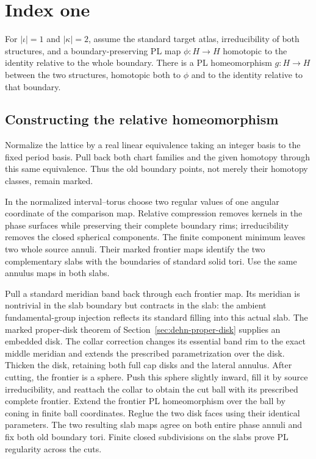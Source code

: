 \section{Index one}
\label{sec:relative-rigidity-index-one}
\label{sec:index-one}

\begin{theorem}
\label{thm:rigidity-index-one}
For $|\iota|=1$ and $|\kappa|=2$, assume the standard target atlas,
irreducibility of both structures, and a boundary-preserving PL map
$\phi:H\to H$ homotopic to the identity relative to the whole boundary.
There is a PL homeomorphism $g:H\to H$ between the two structures,
homotopic both to $\phi$ and to the identity relative to that boundary.
\end{theorem}

\subsection{Constructing the relative homeomorphism}

Normalize the lattice by a real linear equivalence taking an integer
basis to the fixed period basis. Pull back both chart families and the
given homotopy through this same equivalence. Thus the old boundary
points, not merely their homotopy classes, remain marked.

In the normalized interval--torus choose two regular values of one
angular coordinate of the comparison map. Relative compression removes
kernels in the phase surfaces while preserving their complete boundary
rims; irreducibility removes the closed spherical components. The
finite component minimum leaves two whole source annuli. Their marked
frontier maps identify the two complementary slabs with the boundaries
of standard solid tori. Use the same annulus maps in both slabs.

Pull a standard meridian band back through each frontier map. Its
meridian is nontrivial in the slab boundary but contracts in the slab:
the ambient fundamental-group injection reflects its standard filling
into this actual slab. The marked proper-disk theorem
of Section~\ref{sec:dehn-proper-disk} supplies an embedded disk.
The collar correction changes its essential band rim to the exact
middle meridian and extends the prescribed parametrization over the
disk. Thicken the disk, retaining both full cap disks and the lateral
annulus. After cutting, the frontier is a sphere. Push this sphere
slightly inward, fill it by source irreducibility, and reattach the
collar to obtain the cut ball with its prescribed complete frontier.
Extend the frontier PL homeomorphism over the ball by coning in finite
ball coordinates. Reglue the two disk faces using their identical
parameters. The two resulting slab maps agree on both entire phase
annuli and fix both old boundary tori. Finite closed subdivisions on
the slabs prove PL regularity across the cuts.

